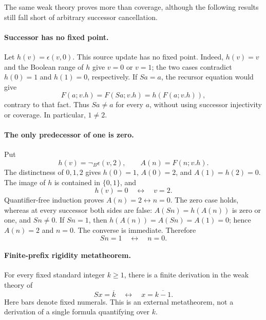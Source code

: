 \documentclass[11pt]{article}
\theoremstyle{definition}\newtheorem{definition}[theorem]{Definition}
\begin{document}
The same weak theory proves more than coverage, although the following
results still fall short of arbitrary successor cancellation.

\paragraph{Successor has no fixed point.}
Let $h(v)=\epsilon(v,0)$. This source update has no fixed point.
Indeed, $h(v)=v$ and the Boolean range of $h$ give $v=0$ or $v=1$;
the two cases contradict $h(0)=1$ and $h(1)=0$, respectively.
If $Sa=a$, the recursor equation would give
\[
 F(a;v.h)=F(Sa;v.h)=h(F(a;v.h)),
\]
contrary to that fact. Thus $Sa\ne a$ for every $a$, without using
successor injectivity or coverage. In particular, $1\ne2$.

\paragraph{The only predecessor of one is zero.}
Put
\[
 h(v)=\neg_B\epsilon(v,2),\qquad A(n)=F(n;v.h).
\]
The distinctness of $0,1,2$ gives $h(0)=1$, $A(0)=2$, and
$A(1)=h(2)=0$. The image of $h$ is contained in $\{0,1\}$, and
\[
                         h(v)=0\quad\longleftrightarrow\quad v=2.
\]
Quantifier-free induction proves $A(n)=2\leftrightarrow n=0$.
The zero case holds, whereas at every successor both sides are false:
$A(Sn)=h(A(n))$ is zero or one, and $Sn\ne0$.
If $Sn=1$, then $h(A(n))=A(Sn)=A(1)=0$; hence $A(n)=2$ and $n=0$.
The converse is immediate. Therefore
\[
                              Sn=1\quad\longleftrightarrow\quad n=0.
\]

\paragraph{Finite-prefix rigidity metatheorem.}
For every fixed standard integer $k\ge1$, there is a finite derivation
in the weak theory of
\begin{equation}
 Sx=\overline{k}\quad\longleftrightarrow\quad x=\overline{k-1}.
 \label{eq:standard-predecessor}
\end{equation}
Here bars denote fixed numerals. This is an external metatheorem,
not a derivation of a single formula quantifying over $k$.
\end{document}
